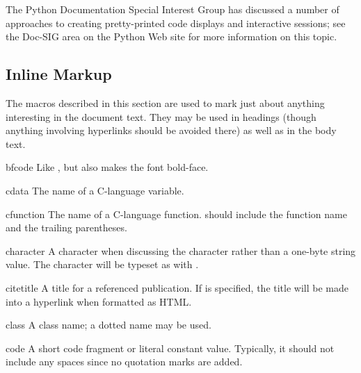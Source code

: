 \documentclass{howto}
\begin{document}
    The Python Documentation Special Interest Group has discussed a
    number of approaches to creating pretty-printed code displays and
    interactive sessions; see the Doc-SIG area on the Python Web site
    for more information on this topic.


  \subsection{Inline Markup}

    The macros described in this section are used to mark just about
    anything interesting in the document text.  They may be used in
    headings (though anything involving hyperlinks should be avoided
    there) as well as in the body text.

    \begin{macrodesc}{bfcode}{}
      Like , but also makes the font bold-face.
    \end{macrodesc}

    \begin{macrodesc}{cdata}{}
      The name of a C-language variable.
    \end{macrodesc}

    \begin{macrodesc}{cfunction}{}
      The name of a C-language function.   should include the
      function name and the trailing parentheses.
    \end{macrodesc}

    \begin{macrodesc}{character}{}
      A character when discussing the character rather than a one-byte
      string value.  The character will be typeset as with .
    \end{macrodesc}

    \begin{macrodesc}{citetitle}{}
      A title for a referenced publication.  If  is specified,
      the title will be made into a hyperlink when formatted as HTML.
    \end{macrodesc}

    \begin{macrodesc}{class}{}
      A class name; a dotted name may be used.
    \end{macrodesc}

    \begin{macrodesc}{code}{}
      A short code fragment or literal constant value.  Typically, it
      should not include any spaces since no quotation marks are
      added.
    \end{macrodesc}
\end{document}
